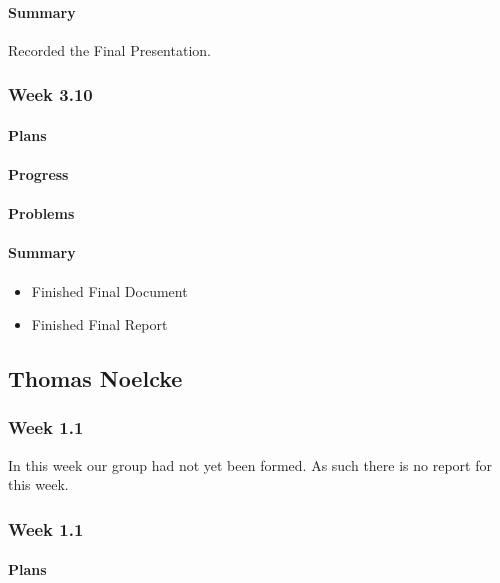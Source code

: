 \documentclass[onecolumn, draftclsnofoot,10pt, compsoc]{article}
\begin{document}
		    \paragraph{Summary} \hfill \break
		        Recorded the Final Presentation.

		\subsubsection{Week 3.10}
		    \paragraph{Plans} \hfill \break

		    \paragraph{Progress} \hfill \break

		    \paragraph{Problems} \hfill \break

		    \paragraph{Summary} \hfill \break
		    	\begin{itemize}
                    \item Finished Final Document
                    \item Finished Final Report
                \end{itemize}


    \subsection{Thomas Noelcke}

        \subsubsection {Week 1.1}
        In this week our group had not yet been formed. As such there is no report for this week.
    \subsubsection{Week 1.1}

		    \paragraph{Plans} \hfill \break
\end{document}
